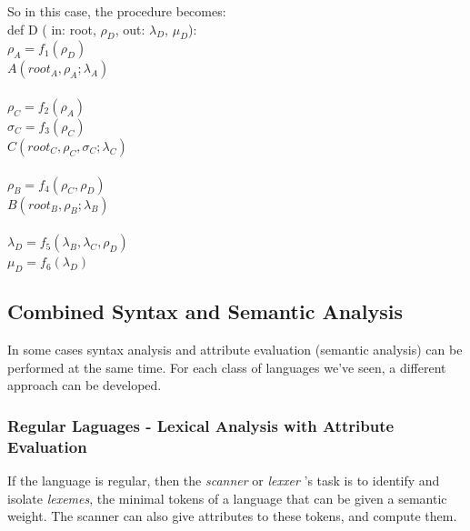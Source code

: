 \documentclass[10pt,a4paper]{article}
\begin{document}
					So in this case, the procedure becomes:\\
					def D ( in: root, $\rho_D$, out: $\lambda_D$, $\mu_D$):\\
				    $\rho_A = f_1(\rho_D)$\\
				    $A(root_A, \rho_A; \lambda_A)$\\\\
					$\rho_C = f_2(\rho_A)$\\
					$\sigma_C = f_3(\rho_C)$\\
					$C(root_C, \rho_C, \sigma_C; \lambda_C)$\\\\
					$\rho_B = f_4(\rho_C, \rho_D)$\\
					$B(root_B, \rho_B; \lambda_B)$\\\\
					$\lambda_D = f_5(\lambda_B, \lambda_C, \rho_D)$\\
					$\mu_D = f_6(\lambda_D)$\\
		
		\subsection{Combined Syntax and Semantic Analysis}
			In some cases syntax analysis and attribute evaluation (semantic analysis) can be performed at the same time. For each class of languages we've seen, a different approach can be developed.
			
			\subsubsection{Regular Laguages - Lexical Analysis with Attribute Evaluation}
				If the language is regular, then the \emph{scanner} or \emph{lexxer} 's task is to identify and isolate \emph{lexemes}, the minimal tokens of a language that can be given a semantic weight. The scanner can also give attributes to these tokens, and compute them.
			
\end{document}
